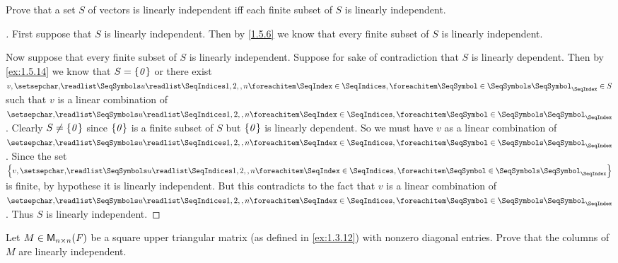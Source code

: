 \begin{ex}\label{ex:1.5.16}
	Prove that a set \(S\) of vectors is linearly independent iff each finite subset of \(S\) is linearly independent.
\end{ex}

\begin{proof}[]
	First suppose that \(S\) is linearly independent.
	Then by \cref{1.5.6} we know that every finite subset of \(S\) is linearly independent.

	Now suppose that every finite subset of \(S\) is linearly independent.
	Suppose for sake of contradiction that \(S\) is linearly dependent.
	Then by \cref{ex:1.5.14} we know that \(S = \left\lbrace\mathit{0}\right\rbrace\) or there exist \(v, \seq{u}{1,2,,n} \in S\) such that \(v\) is a linear combination of \(\seq{u}{1,2,,n}\).
	Clearly \(S \neq \left\lbrace\mathit{0}\right\rbrace\) since \(\left\lbrace\mathit{0}\right\rbrace\) is a finite subset of \(S\) but \(\left\lbrace\mathit{0}\right\rbrace\) is linearly dependent.
	So we must have \(v\) as a linear combination of \(\seq{u}{1,2,,n}\).
	Since the set \(\set{v,\seq{u}{1,2,,n}}\) is finite, by hypothese it is linearly independent.
	But this contradicts to the fact that \(v\) is a linear combination of \(\seq{u}{1,2,,n}\).
	Thus \(S\) is linearly independent.
\end{proof}

\begin{ex}\label{ex:1.5.17}
	Let \(M \in \ms[n][n][\F]\) be a square upper triangular matrix (as defined in \cref{ex:1.3.12}) with nonzero diagonal entries.
	Prove that the columns of \(M\) are linearly independent.
\end{ex}

